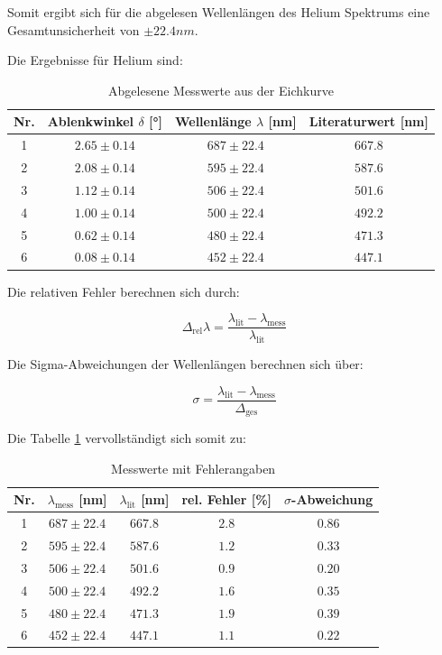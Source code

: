 \documentclass[12pt,a4paper,titlepage]{scrartcl}
\numberwithin{equation}{section}
\numberwithin{table}{section}
\numberwithin{figure}{section}
\begin{document}
Somit ergibt sich für die abgelesen Wellenlängen des Helium Spektrums eine Gesamtunsicherheit von $\pm 22.4nm$.

Die Ergebnisse für Helium sind: 
\begin{table}[H]
    \centering
    \caption{Abgelesene Messwerte aus der Eichkurve}\label{He-tabelle}
    \begin{tabular}{|c|c|c|c|}
        \toprule
        \textbf{Nr.} & \textbf{Ablenkwinkel $\delta$ [°]} & \textbf{Wellenlänge $\lambda$ [nm]} & \textbf{Literaturwert [nm]}\\
        \midrule
        1 & $2.65\pm 0.14$ & $687\pm 22.4$ & $667.8$ \\
        2 & $2.08\pm 0.14$ & $595\pm 22.4$ & $587.6$ \\
        3 & $1.12\pm 0.14$ & $506\pm 22.4$ & $501.6$ \\
        4 & $1.00\pm 0.14$ & $500\pm 22.4$ & $492.2$ \\
        5 & $0.62\pm 0.14$ & $480\pm 22.4$ & $471.3$ \\
        6 & $0.08\pm 0.14$ & $452\pm 22.4$ & $447.1$ \\
    \bottomrule
    \end{tabular}
\end{table}

Die relativen Fehler berechnen sich durch:

\begin{equation}
    \Delta_\text{rel} \lambda = \frac{\lambda_\text{lit} - \lambda_\text{mess}}{\lambda_\text{lit}}
\end{equation}

Die Sigma-Abweichungen der Wellenlängen berechnen sich über:

\begin{equation}
    \sigma = \frac{\lambda_\text{lit} - \lambda_\text{mess}}{\Delta_\text{ges}}
\end{equation}

Die Tabelle \ref{He-tabelle} vervollständigt sich somit zu:
\begin{table}[H]
    \centering
    \caption{Messwerte mit Fehlerangaben}\label{He-tabelle-vollständig}
    \begin{tabular}{ccccc}
        \toprule
        \textbf{Nr.} & \textbf{ $\lambda_\text{mess}$ [nm]} & \textbf{$\lambda_\text{lit}$ [nm]} & \textbf{rel. Fehler} [\%]& \textbf{$\sigma$-Abweichung}\\
        \midrule
        1 & $687\pm 22.4$ & $667.8$ & $ 2.8$ & $0.86$ \\
        2 & $595\pm 22.4$ & $587.6$ & $ 1.2$ & $0.33$ \\
        3 & $506\pm 22.4$ & $501.6$ & $ 0.9$ & $0.20$ \\
        4 & $500\pm 22.4$ & $492.2$ & $ 1.6$ & $0.35$ \\
        5 & $480\pm 22.4$ & $471.3$ & $ 1.9$ & $0.39$ \\
        6 & $452\pm 22.4$ & $447.1$ & $ 1.1$ & $0.22$ \\
    \bottomrule
    \end{tabular}
\end{table} 
\end{document}
